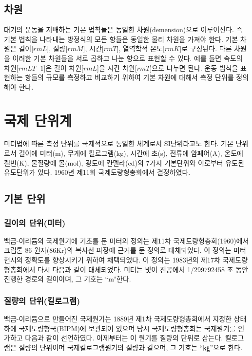 \subsection{차원}
대기의 운동을 지배하는 기본 법칙들은 동일한 차원(demension)으로 이루어진다. 즉 기본 법칙을 나타내는 방정식의 모든 항들은 동일한 물리 차원을 가져야 한다. 기본 차원은 길이[$rmL$], 질량[$rmM$], 시간[$rmT$], 열역학적 온도[$rmK$]로 구성된다. 다른 차원을 이러한 기본 차원들을 서로 곱하고 나눈 항으로 표현할 수 있다. 예를 들면 속도의 차원[$rmLT^-1$]은 길이 차원[$rmL$]을 시간 차원[$rmT$]으로 나누면 된다. 운동 법칙을 표현하는 항들의 규모를 측정하고 비교하기 위하여 기본 차원에 대해서 측정 단위를 정의해야 한다.


\section{국제 단위계}
미터법에 따른 측정 단위를 국제적으로 통일한 체계로서 SI단위라고도 한다. 기본 단위로서 길이에 미터(m), 무게에 킬로그램(kg), 시간에 초(s), 전류에 암페어(A), 온도에 켈빈(K), 물질량에 몰(mol), 광도에 칸델라(cd)의 7가지 기본단위와 이로부터 유도된 유도단위가 있다. 1960년 제11회 국제도량형총회에서 결정하였다.

\subsection{기본 단위}

\subsubsection{길이의 단위(미터)}
백금-이리듐의 국제원기에 기초를 둔 미터의 정의는 제11차 국제도량형총회(1960)에서 크립톤 86 원자(86Kr)의 복사선 파장에 근거를 둔 정의로 대체되었다. 이 정의는 미터 현시의 정확도를 향상시키기 위하여 채택되었다. 이 정의는 1983년의 제17차 국제도량형총회에서 다시 다음과 같이 대체되었다. 미터는 빛이 진공에서 1/299792458 초 동안 진행한 경로의 길이이며, 그 기호는 “m"\로 한다.

\subsubsection{질량의 단위(킬로그램)}
백금-이리듐으로 만들어진 국제원기는 1889년 제1차 국제도량형총회에서 지정한 상태 하에 국제도량형국(BIPM)에 보관되어 있으며 당시 국제도량형총회는 국제원기를 인가하고 다음과 같이 선언하였다. 이제부터는 이 원기를 질량의 단위로 삼는다. 킬로그램은 질량의 단위이며 국제킬로그램원기의 질량과 같으며, 그 기호는 “㎏”으로 한다.

